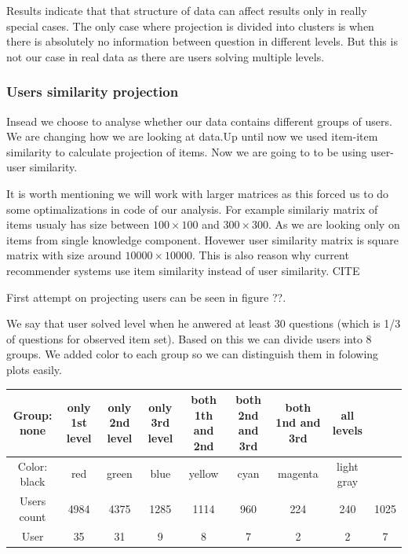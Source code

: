 \documentclass[
  digital, %
  table,   %
  nolof,     %
  nolot,     %
  nocover
]{fithesis3}
\begin{document}
Results indicate that that structure of data can affect results only in really special cases. The only case where projection is divided into clusters is when there is absolutely no information between question in different levels. But this is not our case in real data as there are users solving multiple levels.

\subsubsection{Users similarity
projection}\label{users-similarity-projection}

Insead we choose to analyse whether our data contains different groups
of users. We are changing how we are looking at data.Up until now we
used item-item similarity to calculate projection of items. Now we are
going to to be using user-user similarity.

It is worth mentioning we will work with larger matrices as this forced
us to do some optimalizations in code of our analysis. For example
similariy matrix of items usualy has size between $100\times 100$ and
$300\times 300$. As we are looking only on items from single knowledge
component. Hovewer user similarity matrix is square matrix with size
around $10 000\times 10 000$. This is also reason why current
recommender systems use item similarity instead of user similarity. CITE

First attempt on projecting users can be seen in figure ??.


We say that user solved level when he anwered at least 30 questions
(which is 1/3 of questions for observed item set). Based on this we can
divide users into 8 groups. We added color to each group so we can
distinguish them in folowing plots easily.

\begin{center}
  \begin{tabular}{|c|c c c c c c c c|}
    \hline
    Group: none & only 1st level & only 2nd level & only 3rd level & both 1th and 2nd & both 2nd and 3rd & both 1nd and 3rd & all levels \\
    \hline
    Color: black & red & green & blue & yellow & cyan & magenta & light gray \\
    \hline
    Users count & 4984 & 4375 & 1285 & 1114 & 960 & 224 & 240 & 1025 \\
    \hline
    User & 35 & 31 & 9 & 8 & 7 & 2 & 2 & 7 \\
    \hline
  \end{tabular}
\end{center}
\end{document}
